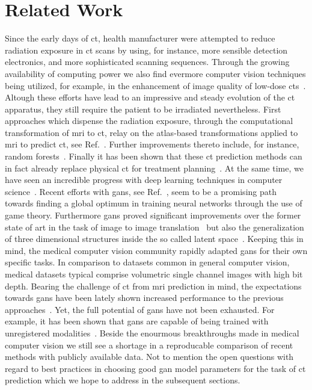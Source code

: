 \section{Related Work}

Since the early days of \gls{ct}, health manufacturer were attempted to reduce
radiation exposure in \gls{ct} scans by using, for instance, more sensible
detection electronics, and more sophisticated scanning sequences. Through the
growing availability of computing power we also find evermore computer vision
techniques being utilized, for example, in the enhancement of image quality of
low-dose \gls{ct}s~\cite{Xu12}. Altough these efforts have lead to an
impressive and steady evolution of the \gls{ct} apparatus, they still require
the patient to be irradiated nevertheless.
First approaches which dispense the radiation exposure, through the
computational transformation of \gls{mri} to \gls{ct}, relay on the
atlas-based transformations applied to \gls{mri} to predict \gls{ct}, see
Ref.~\cite{Hofmann08}. Further improvements thereto include, for instance,
random forests~\cite{Andreasen13}. Finally it has been shown that these
\gls{ct} prediction methods can in fact already replace physical \gls{ct}
for treatment planning~\cite{Andreasen2017}.
At the same time, we have seen an incredible progress with deep learning
techniques in computer science~\cite{LeCun15}. Recent efforts with \gls{gan}s,
see Ref.~\cite{Goodfellow14}, seem to be a promising path towards finding
a global optimum in training neural networks through the use of game theory.
Furthermore \gls{gan}s proved significant improvements over the former state
of art in the task of image to image translation~\cite{Isola16} but also the
generalization of three dimensional structures inside the so called latent
space~\cite{ZXFT16}.
Keeping this in mind, the medical computer vision community rapidly adapted
\gls{gan}s for their own specific tasks. In comparison to datasets common in
general computer vision, medical datasets typical comprise volumetric single
channel images with high bit depth. Bearing the challenge of \gls{ct} from
\gls{mri} prediction in mind, the expectations towards \gls{gan}s have been
lately shown increased performance to the previous approaches~\cite{Nie16}.
Yet, the full potential of \gls{gan}s have not been exhausted. For example,
it has been shown that \gls{gan}s are capable of being trained with
unregistered modalities~\cite{Wolterink17}.
Beside the enourmous breakthroughs made in medical computer vision we still
see a shortage in a reproducable comparison of recent methods with publicly
available data. Not to mention the open questions with regard to best
practices in choosing good \gls{gan} model parameters for the task of
\gls{ct} prediction which we hope to address in the subsequent sections.
